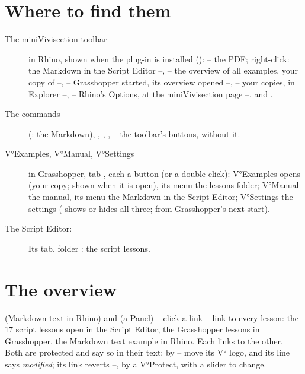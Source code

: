 \section{Where to find them}\label{sec:findexamples}

\begin{description}
  \item[The miniVivisection toolbar] in Rhino, shown when the plug-in is installed ():
         -- the PDF; right-click: the Markdown in the Script Editor --,  -- the overview of all
        examples, your copy of  --,  -- Grasshopper started, its overview
         opened --,  -- your copies, in Explorer --,
         -- Rhino's Options, at the miniVivisection page --,  and .
  \item[The commands]  (: the Markdown),
        , , ,
         -- the toolbar's buttons, without it.
  \item[V°Examples, V°Manual, V°Settings] in Grasshopper, tab , each a button (or a
        double-click): V°Examples opens  (your copy; shown when it is open), its menu the lessons
        folder; V°Manual the manual, its menu the Markdown in the Script Editor; V°Settings the settings
        ( shows or hides all three; from Grasshopper's next start).
  \item[The Script Editor:] Its  tab, folder : the script lessons.
\end{description}

\section{The overview}

 (Markdown text in Rhino) and  (a Panel) -- click a
link -- link to every lesson: the 17 script lessons open in the Script Editor, the Grasshopper lessons in Grasshopper, the
Markdown text example in Rhino. Each links to the other. Both are protected and say so in their text: 
by  -- move its V° logo, and its line says \emph{modified}; its link reverts --,  by a
V°Protect, with a slider to change.

